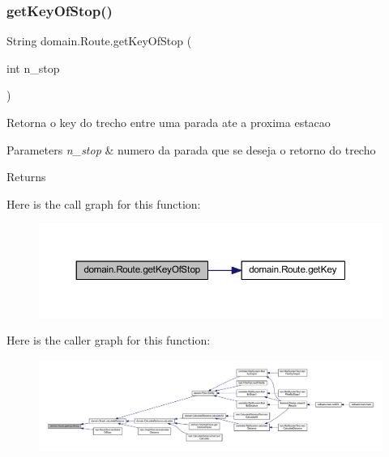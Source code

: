 \subsubsection{\texorpdfstring{get\+Key\+Of\+Stop()}{getKeyOfStop()}}
{\footnotesize\ttfamily String domain.\+Route.\+get\+Key\+Of\+Stop (\begin{DoxyParamCaption}\item[{int}]{n\+\_\+stop }\end{DoxyParamCaption})}

Retorna o key do trecho entre uma parada ate a proxima estacao


\begin{DoxyParams}{Parameters}
{\em n\+\_\+stop} & numero da parada que se deseja o retorno do trecho \\
\hline
\end{DoxyParams}
\begin{DoxyReturn}{Returns}

\end{DoxyReturn}
Here is the call graph for this function\+:\nopagebreak
\begin{figure}[H]
\begin{center}
\leavevmode
\includegraphics[width=350pt]{classdomain_1_1_route_aec22d9627aa0a3afd7bf20a61a0f4695_cgraph}
\end{center}
\end{figure}
Here is the caller graph for this function\+:\nopagebreak
\begin{figure}[H]
\begin{center}
\leavevmode
\includegraphics[width=350pt]{classdomain_1_1_route_aec22d9627aa0a3afd7bf20a61a0f4695_icgraph}
\end{center}
\end{figure}
\mbox{\label{classdomain_1_1_route_a26f7bfa398e907882925e09b197dabec}} 
